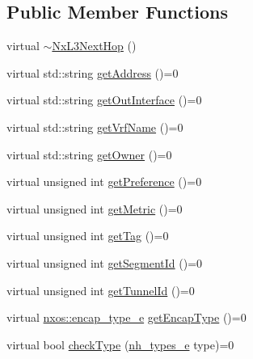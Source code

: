 \subsection*{Public Member Functions}
\begin{DoxyCompactItemize}
\item 
virtual \mbox{\hyperlink{classnxos_1_1_nx_l3_next_hop_a98362517a1a558bc9ecf457452273afb}{$\sim$\+Nx\+L3\+Next\+Hop}} ()
\item 
virtual std\+::string \mbox{\hyperlink{classnxos_1_1_nx_l3_next_hop_a3a14a096cdf818a156c1be62623e644c}{get\+Address}} ()=0
\item 
virtual std\+::string \mbox{\hyperlink{classnxos_1_1_nx_l3_next_hop_a768953432b23d2d35cb6d5ff1b47cfa2}{get\+Out\+Interface}} ()=0
\item 
virtual std\+::string \mbox{\hyperlink{classnxos_1_1_nx_l3_next_hop_ab4488d93cc0df12157430dd86f5f4242}{get\+Vrf\+Name}} ()=0
\item 
virtual std\+::string \mbox{\hyperlink{classnxos_1_1_nx_l3_next_hop_a03ae40373ad9be88b6a18e7119aff080}{get\+Owner}} ()=0
\item 
virtual unsigned int \mbox{\hyperlink{classnxos_1_1_nx_l3_next_hop_a88cebcbe727acec85e772c34b9138b18}{get\+Preference}} ()=0
\item 
virtual unsigned int \mbox{\hyperlink{classnxos_1_1_nx_l3_next_hop_a3d72a5a7b99b292b11248b25daef63c0}{get\+Metric}} ()=0
\item 
virtual unsigned int \mbox{\hyperlink{classnxos_1_1_nx_l3_next_hop_ab1f31be8dc748644f6ee2e4d6cbfda6c}{get\+Tag}} ()=0
\item 
virtual unsigned int \mbox{\hyperlink{classnxos_1_1_nx_l3_next_hop_a21b283ed84a9519fab6fef635e6f21d9}{get\+Segment\+Id}} ()=0
\item 
virtual unsigned int \mbox{\hyperlink{classnxos_1_1_nx_l3_next_hop_aaaf9a3c718cf01e57c36d95a4fd19980}{get\+Tunnel\+Id}} ()=0
\item 
virtual \mbox{\hyperlink{nx__common_8h_a2a822a577ca51dbe26b8637c22eb4ca0}{nxos\+::encap\+\_\+type\+\_\+e}} \mbox{\hyperlink{classnxos_1_1_nx_l3_next_hop_ab873695bc97ea1085013056e4989a297}{get\+Encap\+Type}} ()=0
\item 
virtual bool \mbox{\hyperlink{classnxos_1_1_nx_l3_next_hop_a8a061c4cbcd814b197ea778514a20cb8}{check\+Type}} (\mbox{\hyperlink{classnxos_1_1_nx_l3_next_hop_ab58475e35a53b76cb9bdbfde04d537f3}{nh\+\_\+types\+\_\+e}} type)=0
\end{DoxyCompactItemize}


